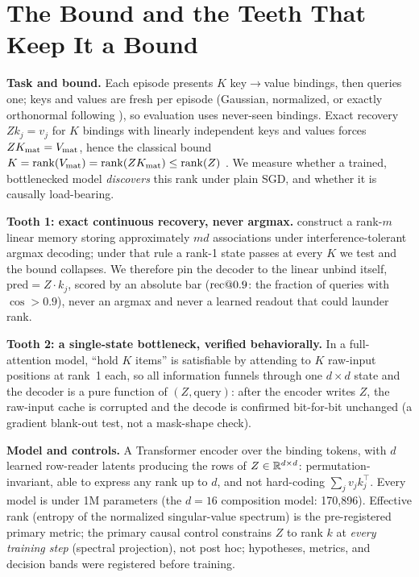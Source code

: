 \section{The Bound and the Teeth That Keep It a Bound}
\label{sec:setup}

\textbf{Task and bound.} Each episode presents $K$ key$\to$value
bindings, then queries one; keys and values are fresh per episode
(Gaussian, normalized, or exactly orthonormal following
\citealp{mezzadri2007random}), so evaluation uses never-seen bindings. Exact recovery $Z k_j = v_j$
for $K$ bindings with linearly independent keys and values forces
$Z K_{\mathrm{mat}} = V_{\mathrm{mat}}$, hence the classical bound
$K = \operatorname{rank}(V_{\mathrm{mat}}) = \operatorname{rank}(Z K_{\mathrm{mat}}) \leq \operatorname{rank}(Z)$
\citep{kohonen1972correlation,anderson1972simple}. We measure whether a
trained, bottlenecked model \emph{discovers} this rank under plain SGD,
and whether it is causally load-bearing.

\textbf{Tooth 1: exact continuous recovery, never argmax.}
\citet{nichani2025factual} construct a rank-$m$ linear memory storing
approximately $md$ associations under interference-tolerant argmax
decoding; under that rule a rank-1 state passes at every $K$ we test
and the bound collapses. We therefore pin the decoder to the linear
unbind itself, $\mathrm{pred} = Z \cdot k_j$, scored by an absolute bar
($\mathrm{rec}@0.9$: the fraction of queries with $\cos > 0.9$), never an
argmax and never a learned readout that could launder rank.

\textbf{Tooth 2: a single-state bottleneck, verified behaviorally.}
In a full-attention model, ``hold $K$ items'' is satisfiable by
attending to $K$ raw-input positions at rank~1 each, so all information
funnels through one $d \times d$ state and the decoder is a pure
function of $(Z, \mathrm{query})$: after the encoder writes $Z$, the
raw-input cache is corrupted and the decode is confirmed bit-for-bit
unchanged (a gradient blank-out test, not a mask-shape check).

\textbf{Model and controls.} A Transformer encoder over the binding
tokens, with $d$ learned row-reader latents producing the rows of
$Z \in \mathbb{R}^{d \times d}$: permutation-invariant, able to express any
rank up to $d$, and not hard-coding $\sum_j v_j k_j^\top$. Every model
is under 1M parameters (the $d = 16$ composition model: 170{,}896).
Effective rank (entropy of the normalized singular-value spectrum) is
the pre-registered primary metric; the primary causal control
constrains $Z$ to rank $k$ at \emph{every training step} (spectral
projection), not post hoc; hypotheses, metrics, and decision bands were
registered before training.
